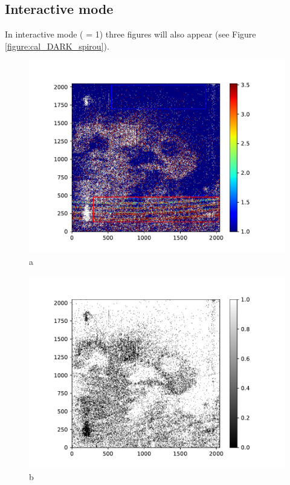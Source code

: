 \newpage
\subsection{Interactive mode}


\noindent In interactive mode ( = 1) three figures will also appear (see Figure \ref{figure:cal_DARK_spirou}).


\begin{figure}

\begin{center}
\begin{minipage}{.495\textwidth}
\begin{center}
\includegraphics[width=\textwidth]{Figures/cal_DARK_spirou_1.pdf}
a
\end{center}
\end{minipage}%
\begin{minipage}{.495\textwidth}
\begin{center}
\includegraphics[width=\textwidth]{Figures/cal_DARK_spirou_2.pdf}
b
\end{center}
\end{minipage}%
\end{center}


\end{figure}
